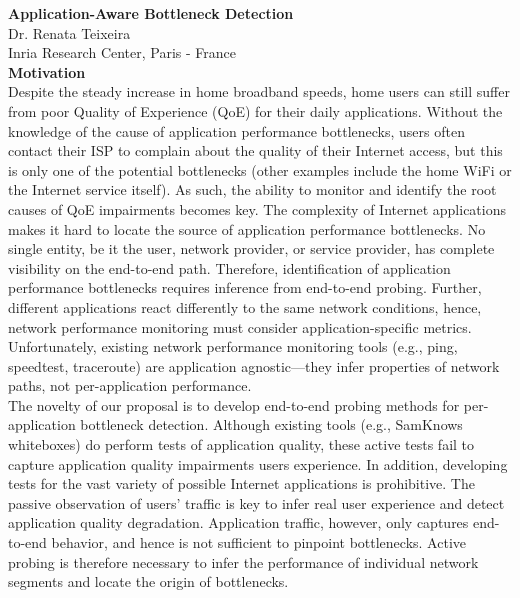 \documentclass[11 pt]{article}
\begin{document}

\noindent \textbf{Application-Aware Bottleneck Detection}\\
Dr. Renata Teixeira \\
Inria Research Center, Paris - France\\

\noindent \textbf{Motivation}\\

Despite the steady increase in home broadband speeds, home users can still suffer from poor Quality of Experience (QoE) for their daily applications. Without the knowledge of the cause of application performance bottlenecks, users often contact their ISP to complain about the quality of their Internet access, but this is only one of the potential bottlenecks (other examples include the home WiFi or the Internet service itself). As such, the ability to monitor and identify the root causes of QoE impairments becomes key. The complexity of Internet applications makes it hard to locate the source of application performance bottlenecks. No single entity, be it the user, network provider, or service provider, has complete visibility on the end-to-end path. Therefore, identification of application performance bottlenecks requires inference from end-to-end probing. Further, different applications react differently to the same network conditions, hence, network performance monitoring must consider application-specific metrics. Unfortunately, existing network performance monitoring tools (e.g., ping, speedtest, traceroute) are application agnostic---they infer properties of network paths, not per-application performance.\\

The novelty of our proposal is to develop end-to-end probing methods for per-application bottleneck detection. Although existing tools (e.g., SamKnows whiteboxes) do perform tests of application quality, these active tests fail to capture application quality impairments users experience. In addition, developing tests for the vast variety of possible Internet applications is prohibitive. The passive observation of users' traffic is key to infer real user experience and detect application quality degradation. Application traffic, however, only captures end-to-end behavior, and hence is not sufficient to pinpoint bottlenecks. Active probing is therefore necessary to infer the performance of individual network segments and locate the origin of bottlenecks.\\
\end{document}

